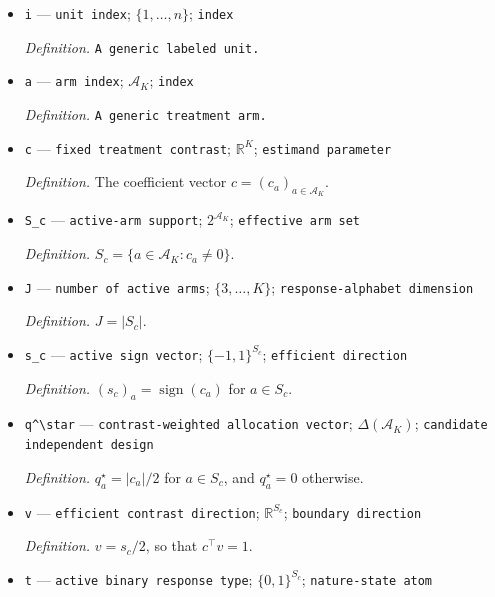 \documentclass{article}
\begin{document}
\begin{itemize}
  \par\smallskip\noindent\emph{Definition.} \texttt{A positive rational width requested for the enclosure of the exact algebraic Bayes certificate.}
  \item \texttt{i} --- \texttt{unit index}; \(\{1,\ldots,n\}\); \texttt{index}
  \par\smallskip\noindent\emph{Definition.} \texttt{A generic labeled unit.}
  \item \texttt{a} --- \texttt{arm index}; \(\mathcal A_K\); \texttt{index}
  \par\smallskip\noindent\emph{Definition.} \texttt{A generic treatment arm.}
  \item \texttt{c} --- \texttt{fixed treatment contrast}; \(\mathbb R^K\); \texttt{estimand parameter}
  \par\smallskip\noindent\emph{Definition.} The coefficient vector \(c=(c_a)_{a\in\mathcal A_K}\).
  \item \texttt{S\_\allowbreak{}c} --- \texttt{active-\allowbreak{}arm support}; \(2^{\mathcal A_K}\); \texttt{effective arm set}
  \par\smallskip\noindent\emph{Definition.} \(S_c=\{a\in\mathcal A_K:c_a\ne0\}\).
  \item \texttt{J} --- \texttt{number of active arms}; \(\{3,\ldots,K\}\); \texttt{response-\allowbreak{}alphabet dimension}
  \par\smallskip\noindent\emph{Definition.} \(J=|S_c|\).
  \item \texttt{s\_\allowbreak{}c} --- \texttt{active sign vector}; \(\{-1,1\}^{S_c}\); \texttt{efficient direction}
  \par\smallskip\noindent\emph{Definition.} \((s_c)_a=\operatorname{sign}(c_a)\) for \(a\in S_c\).
  \item \texttt{q\textasciicircum{}\textbackslash{}\allowbreak{}star} --- \texttt{contrast-\allowbreak{}weighted allocation vector}; \(\Delta(\mathcal A_K)\); \texttt{candidate independent design}
  \par\smallskip\noindent\emph{Definition.} \(q_a^\star=|c_a|/2\) for \(a\in S_c\), and \(q_a^\star=0\) otherwise.
  \item \texttt{v} --- \texttt{efficient contrast direction}; \(\mathbb R^{S_c}\); \texttt{boundary direction}
  \par\smallskip\noindent\emph{Definition.} \(v=s_c/2\), so that \(c^\top v=1\).
  \item \texttt{t} --- \texttt{active binary response type}; \(\{0,1\}^{S_c}\); \texttt{nature-\allowbreak{}state atom}

\end{itemize}
\end{document}
